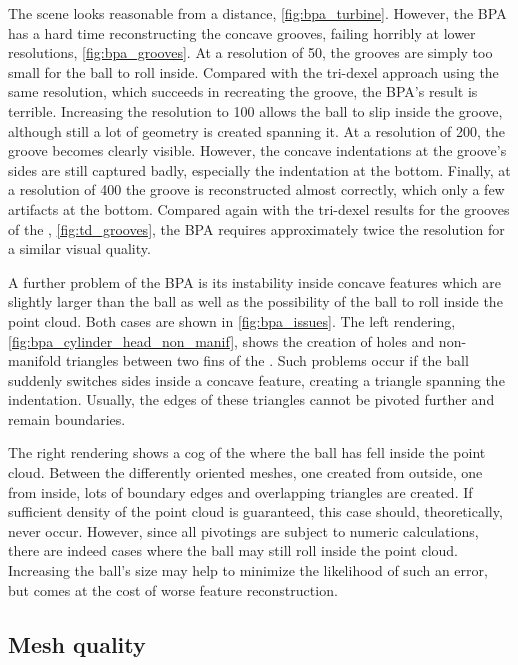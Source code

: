 The \turbine scene looks reasonable from a distance, \cf \cref{fig:bpa_turbine}.
However, the BPA has a hard time reconstructing the concave grooves, failing horribly at lower resolutions, \cf \cref{fig:bpa_grooves}.
At a resolution of 50, the grooves are simply too small for the ball to roll inside.
Compared with the tri-dexel approach using the same resolution, which succeeds in recreating the groove, the BPA's result is terrible.
Increasing the resolution to 100 allows the ball to slip inside the groove, although still a lot of geometry is created spanning it.
At a resolution of 200, the groove becomes clearly visible.
However, the concave indentations at the groove's sides are still captured badly, especially the indentation at the bottom.
Finally, at a resolution of 400 the groove is reconstructed almost correctly, which only a few artifacts at the bottom.
Compared again with the tri-dexel results for the grooves of the \turbine, \cf \cref{fig:td_grooves}, the BPA requires approximately twice the resolution for a similar visual quality.

A further problem of the BPA is its instability inside concave features which are slightly larger than the ball as well as the possibility of the ball to roll inside the point cloud.
Both cases are shown in \cref{fig:bpa_issues}.
The left rendering, \cref{fig:bpa_cylinder_head_non_manif}, shows the creation of holes and non-manifold triangles between two fins of the \cylinderhead.
Such problems occur if the ball suddenly switches sides inside a concave feature, creating a triangle spanning the indentation.
Usually, the edges of these triangles cannot be pivoted further and remain boundaries.

The right rendering shows a cog of the \turbine where the ball has fell inside the point cloud.
Between the differently oriented meshes, one created from outside, one from inside, lots of boundary edges and overlapping triangles are created.
If sufficient density of the point cloud is guaranteed, this case should, theoretically, never occur.
However, since all pivotings are subject to numeric calculations, there are indeed cases where the ball may still roll inside the point cloud.
Increasing the ball's size may help to minimize the likelihood of such an error, but comes at the cost of worse feature reconstruction.


\subsection{Mesh quality}


